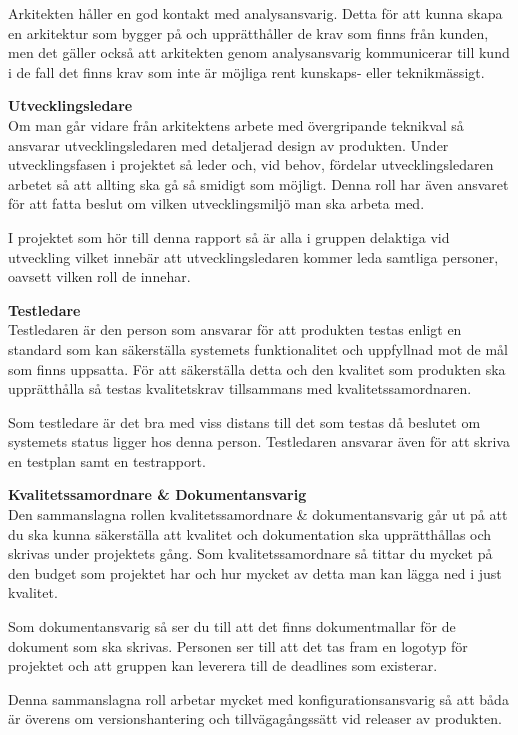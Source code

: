 \documentclass[a4paper,10pt]{article}
\begin{document}
Arkitekten håller en god kontakt med analysansvarig. Detta för att kunna skapa en arkitektur som bygger på och upprätthåller de krav som finns från kunden, men det gäller också att arkitekten genom analysansvarig kommunicerar till kund i de fall det finns krav som inte är möjliga rent kunskaps- eller teknikmässigt.

\textbf{Utvecklingsledare}\\
Om man går vidare från arkitektens arbete med övergripande teknikval så ansvarar utvecklingsledaren med detaljerad design av produkten. Under utvecklingsfasen i projektet så leder och, vid behov, fördelar utvecklingsledaren arbetet så att allting ska gå så smidigt som möjligt. Denna roll har även ansvaret för att fatta beslut om vilken utvecklingsmiljö man ska arbeta med. 

I projektet som hör till denna rapport så är alla i gruppen delaktiga vid utveckling vilket innebär att utvecklingsledaren kommer leda samtliga personer, oavsett vilken roll de innehar.

\textbf{Testledare}\\
Testledaren är den person som ansvarar för att produkten testas enligt en standard som kan säkerställa systemets funktionalitet och uppfyllnad mot de mål som finns uppsatta. För att säkerställa detta och den kvalitet som produkten ska upprätthålla så testas kvalitetskrav tillsammans med kvalitetssamordnaren.

Som testledare är det bra med viss distans till det som testas då beslutet om systemets status ligger hos denna person. Testledaren ansvarar även för att skriva en testplan samt en testrapport.

\textbf{Kvalitetssamordnare & Dokumentansvarig}\\
Den sammanslagna rollen kvalitetssamordnare & dokumentansvarig går ut på att du ska kunna säkerställa att kvalitet och dokumentation ska upprätthållas och skrivas under projektets gång. Som kvalitetssamordnare så tittar du mycket på den budget som projektet har och hur mycket av detta man kan lägga ned i just kvalitet.

Som dokumentansvarig så ser du till att det finns dokumentmallar för de dokument som ska skrivas. Personen ser till att det tas fram en logotyp för projektet och att gruppen kan leverera till de deadlines som existerar. 

Denna sammanslagna roll arbetar mycket med konfigurationsansvarig så att båda är överens om versionshantering och tillvägagångssätt vid releaser av produkten.
\end{document}
